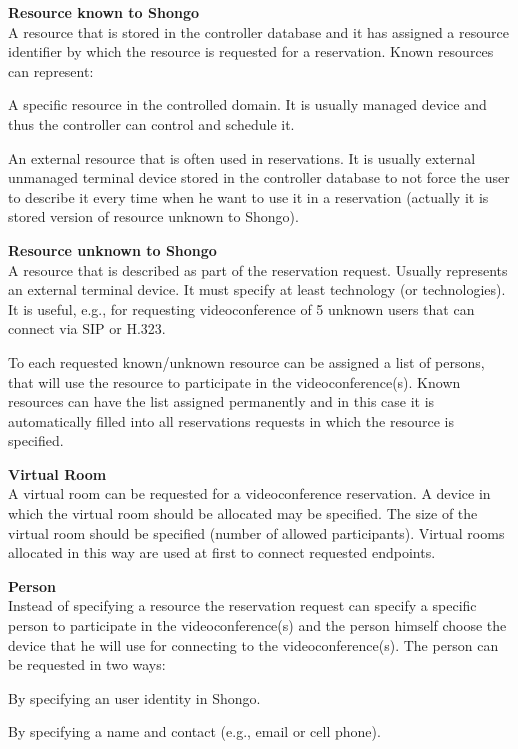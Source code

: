\begin{compactenum}
\item \textbf{Resource known to Shongo} \\
  A resource that is stored in the controller database and it has assigned 
  a resource identifier by which the resource is requested for 
  a reservation. Known resources can represent:
  \begin{compactenum}
  \item A specific resource in the controlled domain. It is usually 
  managed device and thus the controller can control and schedule it.
  \item An external resource that is often used in reservations. It is 
  usually external unmanaged terminal device stored in the controller database
  to not force the user to describe it every time when he want to use it in 
  a reservation (actually it is stored version of resource unknown to Shongo).
  \end{compactenum}
\item \textbf{Resource unknown to Shongo} \\
  A resource that is described as part of the reservation request. Usually 
  represents an external terminal device. It must specify at least technology 
  (or technologies). It is useful, e.g., for requesting videoconference 
  of 5 unknown users that can connect via SIP or H.323.
  
  \vspace{1mm} To each requested known/unknown resource can be assigned a 
  list of persons, that will use the resource to participate in the 
  videoconference(s). Known resources can have the list assigned permanently 
  and in this case it is automatically filled into all reservations requests 
  in which  the resource is specified. 
\item \textbf{Virtual Room} \\
  A virtual room can be requested for a videoconference reservation. A device
  in which the virtual room should be allocated may be specified. The size
  of the virtual room should be specified (number of allowed participants).
  Virtual rooms allocated in this way are used at first to connect 
  requested endpoints.
\item \textbf{Person} \\
  Instead of specifying a resource the reservation request can specify a 
  specific  person to participate in the videoconference(s) and the person 
  himself choose the device that he will use for connecting to the 
  videoconference(s). The person can be requested in two ways:
  \begin{compactenum}
  \item By specifying an user identity in Shongo.
  \item By specifying a name and contact (e.g., email or cell phone).
  \end{compactenum}
\end{compactenum}
